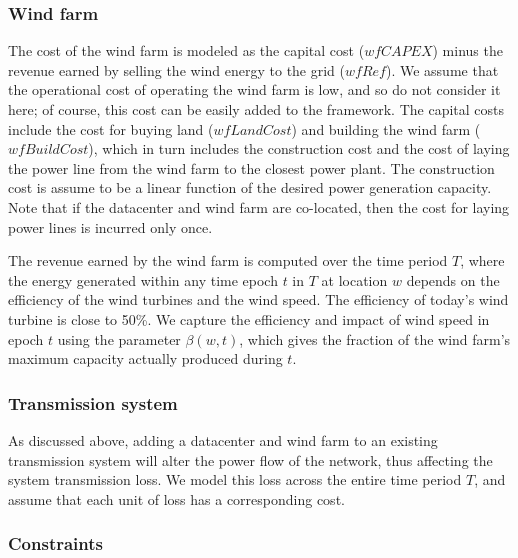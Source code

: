 \subsubsection{Wind farm}  The cost of the wind farm is modeled as the capital cost ($wfCAPEX$) minus the revenue earned by selling the wind energy to the grid ($wfRef$).  We assume that the operational cost of operating the wind farm is low, and so do not consider it here; of course, this cost can be easily added to the framework.  The capital costs include the cost for buying land ($wfLandCost$) and building the wind farm ($wfBuildCost$), which in turn includes the construction cost and the cost of laying the power line from the wind farm to the closest power plant.  The construction cost is assume to be a linear function of the desired power generation capacity.  Note that if the datacenter and wind farm are co-located, then the cost for laying power lines is incurred only once.

The revenue earned by the wind farm is computed over the time period $T$, where the energy generated within any time epoch $t$ in $T$ at location $w$ depends on the efficiency of the wind turbines and the wind speed.  The efficiency of today's wind turbine is close to 50\%.  We capture the efficiency and impact of wind speed in epoch $t$ using the parameter $\beta(w,t)$, which gives the fraction of the wind farm's maximum capacity actually produced during $t$.

\subsubsection{Transmission system} As discussed above, adding a datacenter and wind farm to an existing transmission system will alter the power flow of the network, thus affecting the system transmission loss.  We model this loss across the entire time period $T$, and assume that each unit of loss has a corresponding cost.



\subsubsection{Constraints}

